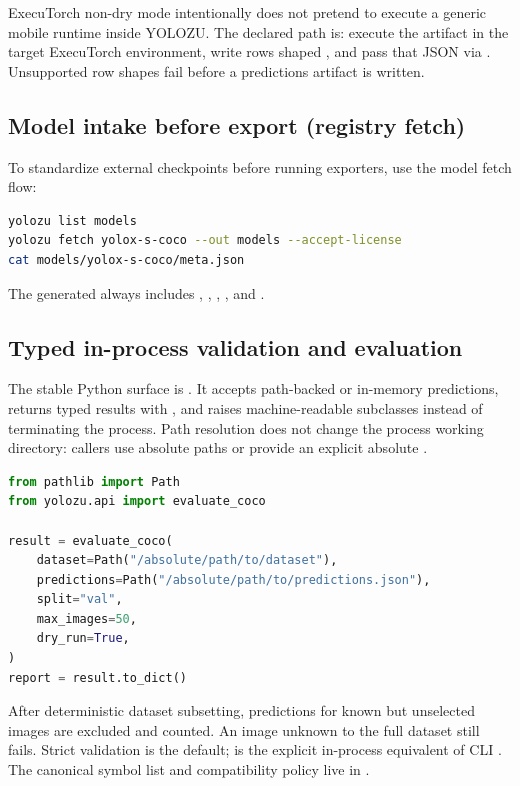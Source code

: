 ExecuTorch non-dry mode intentionally does not pretend to execute a generic
mobile runtime inside YOLOZU. The declared path is: execute the 
artifact in the target ExecuTorch environment, write rows shaped
, and pass that JSON via
. Unsupported row shapes fail before a predictions
artifact is written.

\subsection{Model intake before export (registry fetch)}
To standardize external checkpoints before running exporters, use the model fetch flow:
\begin{lstlisting}[language=bash]
yolozu list models
yolozu fetch yolox-s-coco --out models --accept-license
cat models/yolox-s-coco/meta.json
\end{lstlisting}

The generated  always includes , , , , and .

\subsection{Typed in-process validation and evaluation}

The stable Python surface is . It accepts path-backed or
in-memory predictions, returns typed results with , and raises
machine-readable  subclasses instead of terminating the process.
Path resolution does not change the process working directory: callers use
absolute paths or provide an explicit absolute .

\begin{lstlisting}[language=Python]
from pathlib import Path
from yolozu.api import evaluate_coco

result = evaluate_coco(
    dataset=Path("/absolute/path/to/dataset"),
    predictions=Path("/absolute/path/to/predictions.json"),
    split="val",
    max_images=50,
    dry_run=True,
)
report = result.to_dict()
\end{lstlisting}

After deterministic dataset subsetting, predictions for known but unselected
images are excluded and counted. An image unknown to the full dataset still
fails. Strict validation is the default;  is the explicit
in-process equivalent of CLI . The canonical symbol list and
compatibility policy live in .


